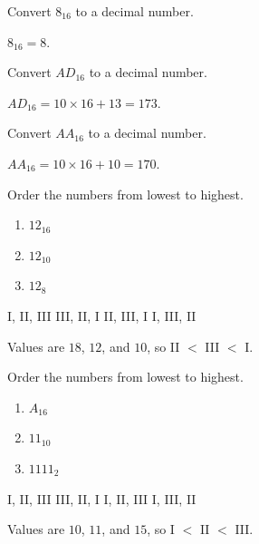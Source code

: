 \question[5]
Convert \(8_{16}\) to a decimal number.
\begin{choices}
\end{choices}
\begin{solution}
  \(8_{16} = 8\).
\end{solution}

\question[5]
Convert \(AD_{16}\) to a decimal number.
\begin{choices}
\end{choices}
\begin{solution}
  \(AD_{16} = 10 \times 16 + 13 = 173\).
\end{solution}

\newpage

\question[5]
Convert \(AA_{16}\) to a decimal number.
\begin{choices}
\end{choices}
\begin{solution}
  \(AA_{16} = 10 \times 16 + 10 = 170\).
\end{solution}

\question[5]
Order the numbers from lowest to highest.
\begin{enumerate}
  \renewcommand{\labelenumi}{\Roman{enumi}.}
  \item \(12_{16}\)
  \item \(12_{10}\)
  \item \(12_{8}\)
\end{enumerate}
\begin{choices}
  \choice I, II, III
  \choice III, II, I
  \CorrectChoice II, III, I
  \choice I, III, II
\end{choices}
\begin{solution}
  Values are \(18\), \(12\), and \(10\), so II \(<\) III \(<\) I.
\end{solution}

\question[5]
Order the numbers from lowest to highest.
\begin{enumerate}
  \renewcommand{\labelenumi}{\Roman{enumi}.}
  \item \(A_{16}\)
  \item \(11_{10}\)
  \item \(1111_{2}\)
\end{enumerate}
\begin{choices}
  \choice I, II, III
  \choice III, II, I
  \CorrectChoice I, II, III
  \choice I, III, II
\end{choices}
\begin{solution}
  Values are \(10\), \(11\), and \(15\), so I \(<\) II \(<\) III.
\end{solution}

